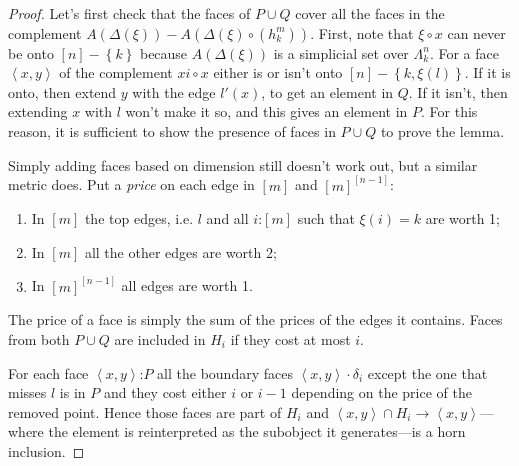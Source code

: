 \documentclass{tac}
\newcommand\of{\mathord:}
\newcommand\set[1]{\left\{#1\right\}}
\newcommand\tuplet[1]{\left\langle{} #1 \right\rangle}
\newcommand\horn[2]{\Lambda^{#1}_{#2}}
\newcommand\Y{\Delta}
\begin{document}
\begin{proof}
  Let's first check that the faces of \(P\cup Q\) cover all the faces in 
  the complement \( A(\Y(\xi)) - A(\Y(\xi)\circ(h^m_k)) \). 
  First, note that \(\xi\circ x\) can never be onto \([n]-\set{k}\) because 
  \(A(\Y(\xi))\) is a simplicial set over \(\horn{n}{k}\).
  For a face \(\tuplet{x,y}\) of the complement \(xi\circ x\) either is or isn't 
  onto \([n]-\set{k,\xi(l)}\). %
  If it is onto, then extend \(y\) with the edge \(l'(x)\), to get an 
  element in \(Q\).
  If it isn't, then extending \(x\) with \(l\) won't make it so, and this gives 
  an element in \(P\). For this reason, it is sufficient to show the presence of 
  faces in \(P\cup Q\) to prove the lemma.

  Simply adding faces based on dimension still doesn't work out, but a similar
  metric does. Put a \emph{price} on each edge in \([m]\) and \({[m]}^{[n-1]}\):
  \begin{enumerate}
    \item In \([m]\) the top edges, i.e. \(l\) and all \(i\of [m]\) such 
    that \(\xi(i) = k\) are worth 1;
    \item In \([m]\) all the other edges are worth 2;
    \item In \({[m]}^{[n-1]}\) all edges are worth 1.
  \end{enumerate}
  The price of a face is simply the sum of the prices of the edges it contains. 
  Faces from both \(P\cup Q\) are included in \(H_i\) if they cost at 
  most \(i\).

  For each face \(\tuplet{x,y}\of P\)
  all the boundary faces \(\tuplet{x,y}\cdot\delta_i\) except the 
  one that misses \(l\) is in \(P\) and they cost either \(i\) or \(i-1\)
  depending on the price of the removed point. Hence those faces are part of
  \(H_i\) and \(\tuplet{x,y}\cap H_i \to \tuplet{x,y}\)---where the element is
  reinterpreted as the subobject it generates---is a horn inclusion.
  

\end{proof}
\end{document}
